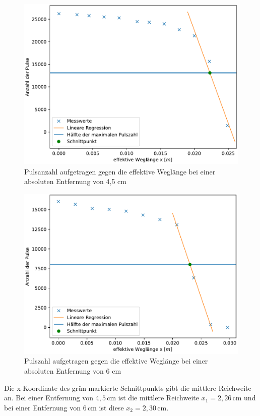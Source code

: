 \begin{figure}[H]
    \centering
    \includegraphics[width=\textwidth]{Plots/plot3.pdf}
    \caption{Pulsanzahl aufgetragen gegen die effektive Weglänge bei einer absoluten Entfernung von 4,5 cm}
    \label{fig:Weglaenge_1}
\end{figure}

\begin{figure}[H]
    \centering
    \includegraphics[width=\textwidth]{Plots/plot4.pdf}
    \caption{Pulszahl aufgetragen gegen die effektive Weglänge bei einer absoluten Entfernung von 6 cm}
    \label{fig:Weglaenge_2}
\end{figure}
Die x-Koordinate des grün markierte Schnittpunkts gibt die mittlere Reichweite an. Bei einer Entfernung von $4,5 \, \unit{\centi\meter}$ ist die mittlere Reichweite 
$x_1 = 2,26 \, \unit{\centi\meter}$ und bei einer Entfernung von $6 \, \unit{\centi\meter}$ ist diese $x_2 = 2,30 \, \unit{\centi\meter}$. 

